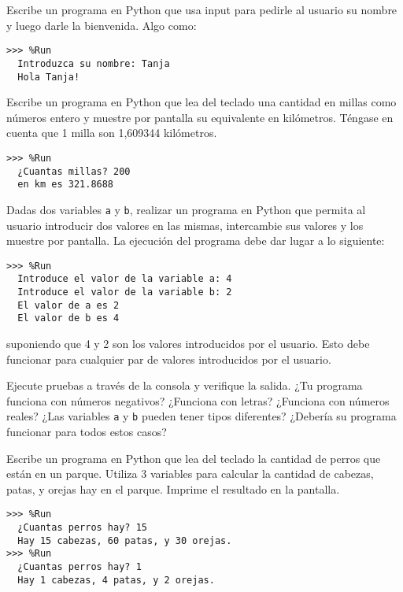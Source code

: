 \begin{ejercicio}Escribe un programa en Python que usa input para pedirle al usuario su nombre y luego darle la bienvenida. Algo como:\\


\begin{Verbatim}[frame=single, label={\em ejemplos y posibles test de ejecución}]
>>> %Run
  Introduzca su nombre: Tanja
  Hola Tanja!
\end{Verbatim}
\end{ejercicio}


\begin{ejercicio}Escribe un programa en Python que lea del teclado una cantidad en millas como números entero y muestre por pantalla su equivalente en kilómetros. Téngase en cuenta que 1 milla son 1,609344 kilómetros.\\

\begin{Verbatim}[frame=single, label={\em ejemplos y posibles test de ejecución}]
>>> %Run
  ¿Cuantas millas? 200
  en km es 321.8688
\end{Verbatim}
\end{ejercicio}



\begin{ejercicio}Dadas dos variables \verb+a+ y \verb+b+,  
realizar un programa en Python que permita al usuario introducir
dos valores en las mismas, intercambie sus valores y los muestre por 
pantalla. La ejecución del programa debe dar lugar a lo siguiente:\\
\begin{Verbatim}[frame=single, label={\em ejemplo de ejecución}]
>>> %Run 
  Introduce el valor de la variable a: 4
  Introduce el valor de la variable b: 2
  El valor de a es 2
  El valor de b es 4
\end{Verbatim}
suponiendo que 4 y 2 son los valores introducidos por el usuario.
Esto debe funcionar para cualquier par de valores introducidos por el usuario.

Ejecute pruebas a través de la consola y verifique la salida. ¿Tu programa funciona con números negativos? ¿Funciona con letras? ¿Funciona con números reales? ¿Las variables \verb+a+ y \verb+b+ pueden tener tipos diferentes? ¿Debería su programa funcionar para todos estos casos?
\end{ejercicio}



\begin{ejercicio}Escribe un programa en Python que lea del teclado la cantidad de perros que están en un parque. Utiliza 3 variables para calcular la cantidad de cabezas, patas, y orejas hay en el parque. Imprime el resultado en la pantalla.\\

\begin{Verbatim}[frame=single, label={\em ejemplos y posibles test de ejecución}]
>>> %Run
  ¿Cuantas perros hay? 15
  Hay 15 cabezas, 60 patas, y 30 orejas.
>>> %Run
  ¿Cuantas perros hay? 1
  Hay 1 cabezas, 4 patas, y 2 orejas.
\end{Verbatim}
\end{ejercicio}


